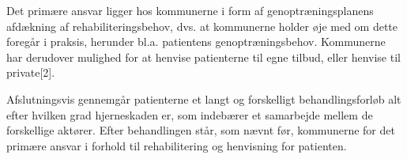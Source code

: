 Det primære ansvar ligger hos kommunerne i form af genoptræningsplanens afdækning af rehabiliteringsbehov, dvs. at kommunerne holder øje med om dette foregår i praksis, herunder bl.a. patientens genoptræningsbehov. Kommunerne har derudover mulighed for at henvise patienterne til egne tilbud, eller henvise til private[2]. %

Afslutningsvis gennemgår patienterne et langt og forskelligt behandlingsforløb alt efter hvilken grad hjerneskaden er, som indebærer et samarbejde mellem de forskellige aktører. Efter behandlingen står, som nævnt før, kommunerne for det primære ansvar i forhold til rehabilitering og henvisning for patienten. %
  



